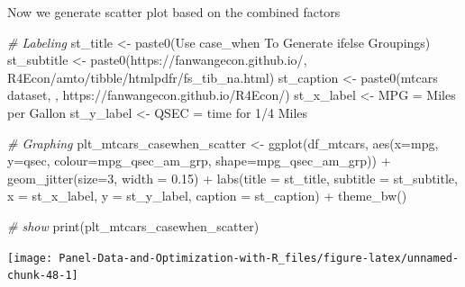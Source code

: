 \documentclass[
]{book}
\newenvironment{Shaded}{\begin{snugshade}}{\end{snugshade}}
\newcommand{\AttributeTok}[1]{\textcolor[rgb]{0.77,0.63,0.00}{#1}}
\newcommand{\CommentTok}[1]{\textcolor[rgb]{0.56,0.35,0.01}{\textit{#1}}}
\newcommand{\DecValTok}[1]{\textcolor[rgb]{0.00,0.00,0.81}{#1}}
\newcommand{\FloatTok}[1]{\textcolor[rgb]{0.00,0.00,0.81}{#1}}
\newcommand{\FunctionTok}[1]{\textcolor[rgb]{0.00,0.00,0.00}{#1}}
\newcommand{\NormalTok}[1]{#1}
\newcommand{\OtherTok}[1]{\textcolor[rgb]{0.56,0.35,0.01}{#1}}
\newcommand{\SpecialCharTok}[1]{\textcolor[rgb]{0.00,0.00,0.00}{#1}}
\newcommand{\StringTok}[1]{\textcolor[rgb]{0.31,0.60,0.02}{#1}}
\begin{document}
Now we generate scatter plot based on the combined factors

\begin{Shaded}
\begin{Highlighting}[]
\CommentTok{\# Labeling}
\NormalTok{st\_title }\OtherTok{\textless{}{-}} \FunctionTok{paste0}\NormalTok{(}\StringTok{\textquotesingle{}Use case\_when To Generate ifelse Groupings\textquotesingle{}}\NormalTok{)}
\NormalTok{st\_subtitle }\OtherTok{\textless{}{-}} \FunctionTok{paste0}\NormalTok{(}\StringTok{\textquotesingle{}https://fanwangecon.github.io/\textquotesingle{}}\NormalTok{,}
                      \StringTok{\textquotesingle{}R4Econ/amto/tibble/htmlpdfr/fs\_tib\_na.html\textquotesingle{}}\NormalTok{)}
\NormalTok{st\_caption }\OtherTok{\textless{}{-}} \FunctionTok{paste0}\NormalTok{(}\StringTok{\textquotesingle{}mtcars dataset, \textquotesingle{}}\NormalTok{,}
                     \StringTok{\textquotesingle{}https://fanwangecon.github.io/R4Econ/\textquotesingle{}}\NormalTok{)}
\NormalTok{st\_x\_label }\OtherTok{\textless{}{-}} \StringTok{\textquotesingle{}MPG = Miles per Gallon\textquotesingle{}}
\NormalTok{st\_y\_label }\OtherTok{\textless{}{-}} \StringTok{\textquotesingle{}QSEC = time for 1/4 Miles\textquotesingle{}}

\CommentTok{\# Graphing}
\NormalTok{plt\_mtcars\_casewhen\_scatter }\OtherTok{\textless{}{-}} 
  \FunctionTok{ggplot}\NormalTok{(df\_mtcars, }
         \FunctionTok{aes}\NormalTok{(}\AttributeTok{x=}\NormalTok{mpg, }\AttributeTok{y=}\NormalTok{qsec, }
             \AttributeTok{colour=}\NormalTok{mpg\_qsec\_am\_grp, }
             \AttributeTok{shape=}\NormalTok{mpg\_qsec\_am\_grp)) }\SpecialCharTok{+}
  \FunctionTok{geom\_jitter}\NormalTok{(}\AttributeTok{size=}\DecValTok{3}\NormalTok{, }\AttributeTok{width =} \FloatTok{0.15}\NormalTok{) }\SpecialCharTok{+}
  \FunctionTok{labs}\NormalTok{(}\AttributeTok{title =}\NormalTok{ st\_title, }\AttributeTok{subtitle =}\NormalTok{ st\_subtitle,}
       \AttributeTok{x =}\NormalTok{ st\_x\_label, }\AttributeTok{y =}\NormalTok{ st\_y\_label, }\AttributeTok{caption =}\NormalTok{ st\_caption) }\SpecialCharTok{+}
  \FunctionTok{theme\_bw}\NormalTok{()}

\CommentTok{\# show}
\FunctionTok{print}\NormalTok{(plt\_mtcars\_casewhen\_scatter)}
\end{Highlighting}
\end{Shaded}

\begin{center}\texttt{[image: Panel-Data-and-Optimization-with-R\_files/figure-latex/unnamed-chunk-48-1]} \end{center}
\end{document}
